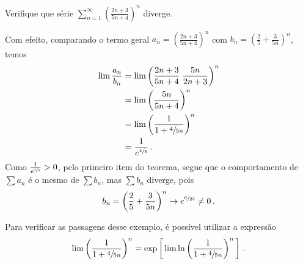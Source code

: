 \begin{example}
    Verifique que série
    \(
      \sum_{n=1}^\infty \left(\frac{2n+3}{5n+4}\right)^n
    \)
    diverge.

    \solution
    Com efeito, comparando o termo geral
    \(
      a_n=\left(\frac{2n+3}{5n+4}\right)^n
    \)
    com
    \(
      b_n=\left(\frac{2}{5} +\frac{3}{5n}\right)^n
    \),
    temos
    \begin{align*}
      \lim \frac{a_n}{b_n} & = \lim \left( \frac{2n+3}{5n+4} \; \frac{5n}{2n+3}\right)^n \\
                           & = \lim \left( \frac{5n}{5n+4}\right)^n                      \\
                           & = \lim \left( \frac{1}{1+\sfrac{4}{5n}}\right)^n            \\
                           & = \frac{1}{e^{\sfrac{4}{5}}}                                \,.
    \end{align*}
    Como
    \(
      \frac{1}{e^{\sfrac{4}{5}}} > 0
    \),
    pelo primeiro item do teorema, segue que o comportamento
    de $\sum a_n$ é o mesmo de $\sum b_n$, mas $\sum b_n$ diverge, pois
    \[
      b_n=\left(\frac{2}{5} +\frac{3}{5n}\right)^n\to e^{\sfrac{6}{25}}\neq 0  \,.
    \]
\end{example}

Para verificar as passagens desse exemplo, é possível utilizar a expressão
\[
  \lim \left( \frac{1}{1+\sfrac{4}{5n}}\right)^n =
  \exp\left[ \,\lim\ln \left( \dfrac{1}{1+\sfrac{4}{5n}}\right)^n \,\right]    \,.
\]

